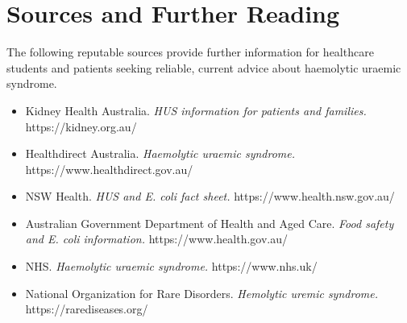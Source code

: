 \section*{Sources and Further Reading}
The following reputable sources provide further information for healthcare students and patients seeking reliable, current advice about haemolytic uraemic syndrome.

\begin{itemize}
    \item Kidney Health Australia. \textit{HUS information for patients and families.} https://kidney.org.au/
    \item Healthdirect Australia. \textit{Haemolytic uraemic syndrome.} https://www.healthdirect.gov.au/
    \item NSW Health. \textit{HUS and E. coli fact sheet.} https://www.health.nsw.gov.au/
    \item Australian Government Department of Health and Aged Care. \textit{Food safety and E. coli information.} https://www.health.gov.au/
    \item NHS. \textit{Haemolytic uraemic syndrome.} https://www.nhs.uk/
    \item National Organization for Rare Disorders. \textit{Hemolytic uremic syndrome.} https://rarediseases.org/
\end{itemize}
